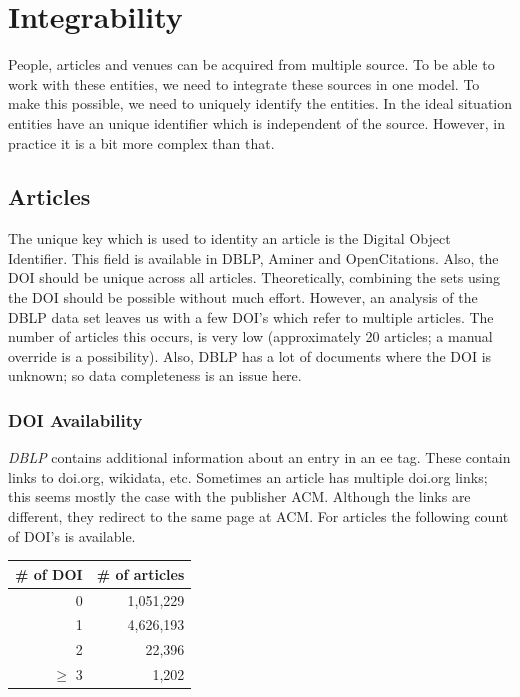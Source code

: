 \documentclass{ou-report}
\newcommand{\doi}{{DOI}}
\begin{document}

\section{Integrability}
\label{sec:data_integrability}
People, articles and venues can be acquired from multiple source. To be able to 
work with these entities, we need to integrate these sources in one model. To 
make this possible, we need to uniquely identify the entities.
In the ideal situation entities have an unique identifier which is 
independent of the source. However, in practice it is a bit more complex than 
that.

\subsection{Articles}
The unique key which is used to identity an article is the Digital Object 
Identifier. This field is available in DBLP, Aminer and OpenCitations. Also, the
\doi{} should be unique across all articles. 
Theoretically, combining the sets using the DOI should be possible without much
effort.
However, an analysis of the DBLP data set leaves us with a few DOI's which refer
to multiple articles. The number of articles this occurs, is very low
(approximately 20 articles; a manual override is a possibility). Also, DBLP 
has a lot of documents where the DOI is unknown; so data completeness 
is an issue here. 

\subsubsection{DOI Availability}
\label{subsec:data_doi_availability}
\emph{DBLP} contains additional information about an entry in an ee tag. These contain 
links to doi.org, wikidata, etc. Sometimes an article has multiple doi.org links; 
this seems mostly the case with the publisher ACM. Although the links are 
different, they redirect to the same page at ACM.
For articles the following count of DOI's is available.
\begin{center}
    \begin{tabular}{ rr }
        \toprule
        \# of DOI & \# of articles \\
        \midrule
        0 & 1,051,229 \\
        1 & 4,626,193 \\
        2 & 22,396 \\
        $\geq$ 3 & 1,202 \\
        \bottomrule
    \end{tabular}
\end{center}
\end{document}

